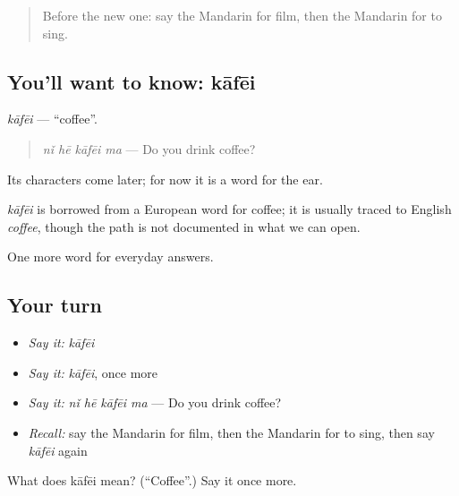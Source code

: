 \label{lesson:ZH-C55-kafei}



\begin{quote}
Before the new one: say the Mandarin for film, then the Mandarin for to sing.
\end{quote}

\subsection*{You'll want to know: kāfēi}
\emph{kāfēi} — \textquotedblleft{}coffee\textquotedblright{}.

\begin{quote}
\emph{nǐ hē kāfēi ma} — Do you drink coffee?
\end{quote}

Its characters come later; for now it is a word for the ear.

\begin{cousinweb}
\emph{kāfēi} is borrowed from a European word for coffee; it is usually traced to English \emph{coffee}, though the path is not documented in what we can open.
\end{cousinweb}

\begin{grammarlens}[title={What you've built}]
One more word for everyday answers.
\end{grammarlens}

\subsection*{Your turn}
\begin{itemize}
\raggedright
  \item \emph{Say it:} \emph{kāfēi}
  \item \emph{Say it:} \emph{kāfēi}, once more
  \item \emph{Say it:} \emph{nǐ hē kāfēi ma} — Do you drink coffee?
  \item \emph{Recall:} say the Mandarin for film, then the Mandarin for to sing, then say \emph{kāfēi} again
\end{itemize}

\begin{tcolorbox}[breakable,colback=teal!4,colframe=teal!35!black,title={Before you move on}]
What does kāfēi mean? (\textquotedblleft{}Coffee\textquotedblright{}.) Say it once more.
\end{tcolorbox}
